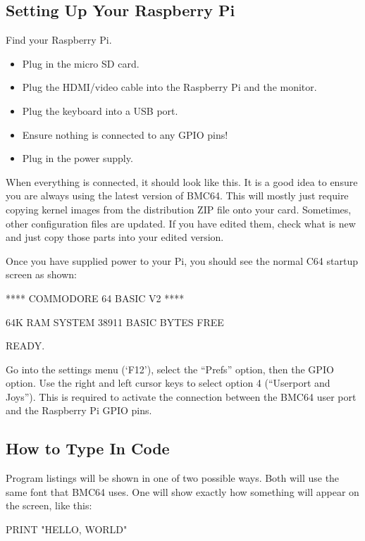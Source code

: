 \subsection*{Setting Up Your Raspberry Pi}


Find your Raspberry Pi.
\begin{itemize}
\item Plug in the micro SD card.
\item Plug the HDMI/video cable into the Raspberry Pi and the monitor.
\item Plug the keyboard into a USB port.
\item Ensure nothing is connected to any GPIO pins!
\item Plug in the power supply.
\end{itemize}

When everything is connected, it should look like this.  It is a good idea to ensure you are always using the latest version of BMC64.  This will mostly just require copying kernel images from the distribution ZIP file onto your card.  Sometimes, other configuration files are updated.  If you have edited them, check what is new and just copy those parts into your edited version.

Once you have supplied power to your Pi, you should see the normal C64 startup screen as shown:
\begin{code}

    **** COMMODORE 64 BASIC V2 ****

 64K RAM SYSTEM  38911 BASIC BYTES FREE

READY.
\end{code}

Go into the settings menu (`F12'), select the ``Prefs'' option, then the GPIO option.  Use the right and left cursor keys to select option 4 (``Userport and Joys'').  This is required to activate the connection between the BMC64 user port and the Raspberry Pi GPIO pins.

\subsection*{How to Type In Code}

Program listings will be shown in one of two possible ways.  Both will use the same font that BMC64 uses.  One will show exactly how something will appear on the screen, like this:
\begin{code}
PRINT "HELLO, WORLD"
\end{code}

